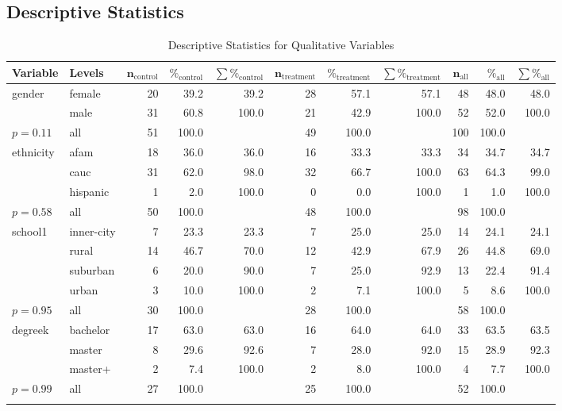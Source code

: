 \documentclass{article}\usepackage[]{graphicx}\usepackage[]{color}
\begin{document}
\clearpage
\begin{landscape}
\section{Descriptive Statistics}
{\footnotesize
\begin{longtable}{ll|rrr|rrr|rrr}
 \textbf{Variable} & \textbf{Levels} & $\mathbf{n_{\mathrm{control}}}$ & $\mathbf{\%_{\mathrm{control}}}$ & $\mathbf{\sum \%_{\mathrm{control}}}$ & $\mathbf{n_{\mathrm{treatment}}}$ & $\mathbf{\%_{\mathrm{treatment}}}$ & $\mathbf{\sum \%_{\mathrm{treatment}}}$ & $\mathbf{n_{\mathrm{all}}}$ & $\mathbf{\%_{\mathrm{all}}}$ & $\mathbf{\sum \%_{\mathrm{all}}}$ \\ 
  \hline
gender & female & 20 & 39.2 & 39.2 & 28 & 57.1 & 57.1 & 48 & 48.0 & 48.0 \\ 
   & male & 31 & 60.8 & 100.0 & 21 & 42.9 & 100.0 & 52 & 52.0 & 100.0 \\ 
   \hline
$p= 0.11$ & all & 51 & 100.0 &  & 49 & 100.0 &  & 100 & 100.0 &  \\ 
   \hline
\hline
ethnicity & afam & 18 & 36.0 & 36.0 & 16 & 33.3 & 33.3 & 34 & 34.7 & 34.7 \\ 
   & cauc & 31 & 62.0 & 98.0 & 32 & 66.7 & 100.0 & 63 & 64.3 & 99.0 \\ 
   & hispanic & 1 & 2.0 & 100.0 & 0 & 0.0 & 100.0 & 1 & 1.0 & 100.0 \\ 
   \hline
$p= 0.58$ & all & 50 & 100.0 &  & 48 & 100.0 &  & 98 & 100.0 &  \\ 
   \hline
\hline
school1 & inner-city & 7 & 23.3 & 23.3 & 7 & 25.0 & 25.0 & 14 & 24.1 & 24.1 \\ 
   & rural & 14 & 46.7 & 70.0 & 12 & 42.9 & 67.9 & 26 & 44.8 & 69.0 \\ 
   & suburban & 6 & 20.0 & 90.0 & 7 & 25.0 & 92.9 & 13 & 22.4 & 91.4 \\ 
   & urban & 3 & 10.0 & 100.0 & 2 & 7.1 & 100.0 & 5 & 8.6 & 100.0 \\ 
   \hline
$p= 0.95$ & all & 30 & 100.0 &  & 28 & 100.0 &  & 58 & 100.0 &  \\ 
   \hline
\hline
degreek & bachelor & 17 & 63.0 & 63.0 & 16 & 64.0 & 64.0 & 33 & 63.5 & 63.5 \\ 
   & master & 8 & 29.6 & 92.6 & 7 & 28.0 & 92.0 & 15 & 28.9 & 92.3 \\ 
   & master+ & 2 & 7.4 & 100.0 & 2 & 8.0 & 100.0 & 4 & 7.7 & 100.0 \\ 
   \hline
$p= 0.99$ & all & 27 & 100.0 &  & 25 & 100.0 &  & 52 & 100.0 &  \\ 
   \hline
\hline
\hline
\caption{Descriptive Statistics for Qualitative Variables} 
\label{}
\end{longtable}
}



\end{landscape}
\end{document}
